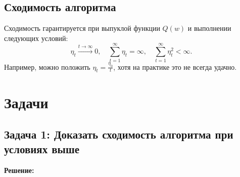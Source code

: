 \subsection*{Сходимость алгоритма}
Сходимость гарантируется при выпуклой функции \( Q(w) \) и выполнении следующих условий:
$$ \eta_t \xrightarrow{t \to \infty} 0, \quad \sum_{t=1}^{\infty} \eta_t = \infty, \quad \sum_{t=1}^{\infty} \eta_t^2 < \infty. $$
Например, можно положить \( \eta_t = \frac{\eta_0}{t} \), хотя на практике это не всегда удачно.

\section*{Задачи}

\subsection*{Задача 1: Доказать сходимость алгоритма при условиях выше}

\textbf{Решение:}

